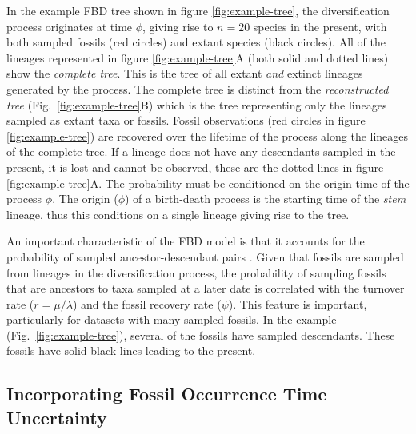 In the example FBD tree shown in figure \ref{fig:example-tree}, the diversification process originates at time $\phi$, giving rise to $n=20$ species in the present, with both sampled fossils (red circles) and extant species (black circles). 
All of the lineages represented in figure \ref{fig:example-tree}A (both solid and dotted lines) show the \textit{complete tree}. 
This is the tree of all extant \textit{and} extinct lineages generated by the process.
The complete tree is distinct from the \textit{reconstructed tree} (Fig.\ \ref{fig:example-tree}B) which is the tree representing only the lineages sampled as extant taxa or fossils.
Fossil observations (red circles in figure \ref{fig:example-tree}) are recovered over the lifetime of the process along the lineages of the complete tree. 
If a lineage does not have any descendants sampled in the present, it is lost and cannot be observed, these are the dotted lines in figure \ref{fig:example-tree}A. 
The probability must be conditioned on the origin time of the process $\phi$. 
The origin ($\phi$) of a birth-death process is the starting time of the \textit{stem} lineage, thus this conditions on a single lineage giving rise to the tree.


An important characteristic of the FBD model is that it accounts for the probability of sampled ancestor-descendant pairs \citep{foote1996}. 
Given that fossils are sampled from lineages in the diversification process, the probability of sampling fossils that are ancestors to taxa sampled at a later date is correlated with the turnover rate ($r=\mu/\lambda$) and the fossil recovery rate ($\psi$).
This feature is important, particularly for datasets with many sampled fossils. 
In the example (Fig.\ \ref{fig:example-tree}), several of the fossils have sampled descendants. These fossils have solid black lines leading to the present. 

\bigskip
\subsection{Incorporating Fossil Occurrence Time Uncertainty}\label{subsect:Intro-TipSampling}

